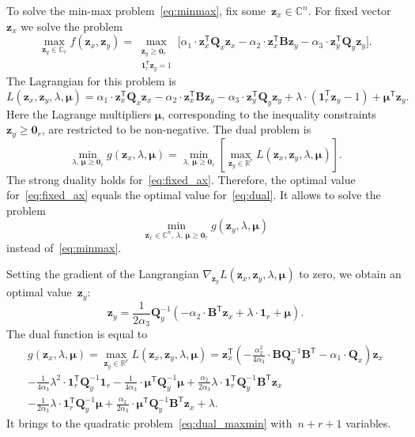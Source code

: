 \documentclass[12pt,twoside]{article}
\theoremstyle{definition}
\newcommand{\bz}{\mathbf{z}}
\newcommand{\bB}{\mathbf{B}}
\newcommand{\bQ}{\mathbf{Q}}
\newcommand{\bbR}{\mathbb{R}}
\newcommand{\T}{\mathsf{T}}
\newcommand{\bmu}{\boldsymbol{\mu}}
\newcommand{\bOne}{\boldsymbol{1}}
\newcommand{\bZero}{\boldsymbol{0}}
\begin{document}
To solve the min-max problem~\eqref{eq:minmax}, fix some~$\bz_x \in \mathbb{C}^n$. For fixed vector~$\bz_x$ we solve the problem
\begin{equation}
	\max_{\bz_y \in \mathbb{C}_r} f(\bz_x, \bz_y) = \max_{\substack{\bz_y \geq \bZero_r \\ \bOne_r^{\T}\bz_y=1}} \bigl[\alpha_1 \cdot \bz_x^{\T} \bQ_x \bz_x - \alpha_2 \cdot \bz_x^{\T} \bB \bz_y - \alpha_3 \cdot \bz_y^{\T} \bQ_y \bz_y \bigr].
	\label{eq:fixed_ax}
\end{equation}
The Lagrangian for this problem is
\[
	L(\bz_x, \bz_y, \lambda, \bmu) = \alpha_1 \cdot \bz_x^{\T} \bQ_x \bz_x - \alpha_2 \cdot \bz_x^{\T} \bB \bz_y - \alpha_3 \cdot \bz_y^{\T} \bQ_y \bz_y + \lambda \cdot  (\bOne_r^{\T} \bz_y - 1) + \bmu^{\T} \bz_y.
\]
Here the Lagrange multipliers $\bmu$, corresponding to the inequality constraints $\bz_y \geq \bZero_r$, are restricted to be non-negative.
The dual problem is
\begin{equation}
	\min_{\lambda, \, \bmu \geq \bZero_r} g(\bz_x, \lambda, \bmu) = \min_{\lambda, \, \bmu \geq \bZero_r}  \left[\max_{\bz_y \in \bbR^r} L(\bz_x, \bz_y, \lambda, \bmu) \right].
	\label{eq:dual}
\end{equation}
The strong duality holds for~\eqref{eq:fixed_ax}. Therefore, the optimal value for~\eqref{eq:fixed_ax} equals the optimal value for~\eqref{eq:dual}. It allows to solve the problem
\begin{equation}
	\min_{\bz_x \in \mathbb{C}^n, \, \lambda, \, \bmu \geq \bZero_r} g(\bz_y, \lambda, \bmu)
	\label{eq:dual_maxmin}
\end{equation}
instead of~\eqref{eq:minmax}.

Setting the gradient of the Langrangian $\nabla_{\bz_y} L(\bz_x, \bz_y, \lambda, \bmu)$ to zero, we obtain an optimal value~$\bz_y$:
\begin{equation}
	\bz_y = \frac{1}{2\alpha_3} \bQ_y^{-1} \left( - \alpha_2 \cdot \bB^{\T} \bz_x +\lambda \cdot \bOne_r + \bmu \right).
	\label{eq:ax}
\end{equation}
The dual function is equal to
\begin{multline}
	g(\bz_x, \lambda, \bmu)
	= \max_{\bz_y \in \bbR^r} L(\bz_x, \bz_y, \lambda, \bmu) =
	\bz_x^{\T} \left( - \frac{\alpha_2^2}{4\alpha_3} \cdot \bB \bQ_y^{-1} \bB^{\T} - \alpha_1 \cdot \bQ_x\right) \bz_x \\ - \frac{1}{4 \alpha_3} \lambda^2 \cdot \bOne_r^{\T} \bQ_y^{-1} \bOne_r - \frac{1}{4 \alpha_3} \cdot \bmu^{\T} \bQ_y^{-1} \bmu + \frac{\alpha_2}{2 \alpha_3} \lambda \cdot \bOne_r^{\T} \bQ_y^{-1} \bB^{\T} \bz_x \\ - \frac{1}{2 \alpha_3} \lambda \cdot \bOne_r^{\T} \bQ_y^{-1} \bmu + \frac{\alpha_2}{2 \alpha_3} \cdot \bmu^{\T} \bQ_y^{-1} \bB^{\T} \bz_x + \lambda.
	 \label{eq:dual_quadratic_form}
\end{multline}
It brings to the quadratic problem~\eqref{eq:dual_maxmin} with~$n + r + 1$ variables.
\end{document}
